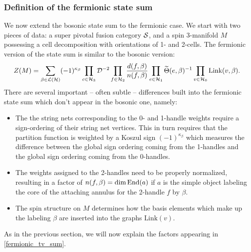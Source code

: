 \subsubsection{Definition of the fermionic state sum}

We now extend the bosonic state sum to the fermionic case. 
We start with two pieces of data: a super pivotal fusion category $\mathcal{S}$, and a spin %
3-manifold $M$ possessing a cell decomposition with orientations of 1- and 2-cells.
The fermionic version of the state sum is similar to the bosonic version:
\begin{align}
\label{fermionic_tv_sum}
	Z(M) = \sum_{\beta\in\mathcal{L}(\mathcal{H})}(-1)^{\kappa_\beta}
		\prod_{c\in\mathcal{H}_3} \mathcal{D}^{-2}
		\prod_{f\in\mathcal{H}_2} \frac{d(f, \beta)}{n(f,\beta)}
		\prod_{e\in\mathcal{H}_1}  \widetilde \Theta(e, \beta)^{-1}
		\prod_{v\in\mathcal{H}_0} \text{Link}(v, \beta) .
\end{align}
There are several important -- often subtle --  differences built into the fermionic state sum which don't appear in the bosonic one, namely:
\begin{itemize} 
\item %
The the string nets corresponding to the 0- and 1-handle weights require a sign-ordering of their string net vertices. 
This in turn requires that the partition function is weighted by a Koszul sign $(-1)^{\kappa_\beta}$
which measures the difference between the global sign ordering coming from the 1-handles and the global sign ordering coming from the 0-handles.
\item The weights assigned to the 2-handles need to be properly normalized, 
resulting in a factor of $n(f,\beta) = \dim \text{End}(a)$ if $a$ is the simple object labeling the core of the attaching annulus for the 2-handle $f$ by $\beta$.
\item The spin structure on $M$ determines how the basis elements which make up the labeling $\beta$ are inserted into
the graphs $\text{Link}(v)$.
\end{itemize} 
As in the previous section, we will now explain 
the factors appearing in \eqref{fermionic_tv_sum}. 

